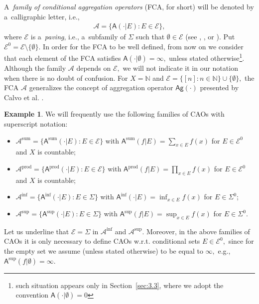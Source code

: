 \documentclass[preprint,11pt]{elsarticle}
\theoremstyle{definition}
\newtheorem{example}[tw]{Example}
\newcommand\mN{{\mathbb N}}
\newcommand\cE{{\mathcal E}}
\newcommand\sA{\mathsf{A}}
\newcommand\aA[2][E]{\sA(#2|#1)}%
\newcommand\aAi[3][E]{\sA^{#3}(#2|#1)}%
\newcommand\bA{\mathscr{A}}%
\newcommand\agg{\mathsf{Ag}}
\newcommand{\tx}{\textstyle{}}
\begin{document}
A~\textit{family of conditional aggregation operators} (FCA, for short) will be denoted by a~calligraphic letter, i.e.,
\begin{align}\label{n:fca}
    \bA=\{\aA{\cdot}\colon E\in \cE\},
\end{align}
where $\mathcal{E}$ is a~\textit{paving}, i.e., a~subfamily of $\Sigma$ such that $\emptyset \in \mathcal{E}$ (see \cite[p.~15]{denneberg00}, \cite[p.~254]{hahn},  or \cite[p.~7]{Pap1995}). Put $\cE^0=\cE\setminus\{\emptyset\}.$
In order for the FCA to be well defined, from now on we consider that each element of the FCA satisfies $\aA[\emptyset]{\cdot}=\infty,$  unless stated otherwise\footnote{such situation appears only in Section~\ref{sec:3.3}, where we adopt the convention $\aA[\emptyset]{\cdot}=0$}.
Although the family $\bA$ depends on $\cE,$ we will not indicate it in our notation when there is no doubt of confusion.  For $X=\mN$ and $\cE=\{[n]\colon n\in\mN\}\cup\{\emptyset\},$ the FCA $\bA$ generalizes the concept of aggregation operator $\agg(\cdot)$ presented by Calvo et al. \cite[Def.~1]{Calvo}.



\begin{example}\label{ex:basicCAOs}
We will frequently use the following families of CAOs  with superscript notation:
\begin{itemize}[noitemsep]
    \item \label{ref:sum} $\bA^{\textrm{sum}}=\{\aAi{\cdot}{\textrm{sum}}\colon E\in \cE\}$ with $\sA^{\textrm{sum}}(f|E)=\tx{\sum_{x\in E} f(x)}$ for $E\in\cE^0$ and $X$ is countable;

    \item \label{ref:prod} $\bA^{\textrm{prod}}=\{\sA^{\textrm{prod}}(\cdot|E)\colon E\in \cE\}$ with $\sA^{\textrm{prod}}(f|E)=\tx{\prod_{x\in E} f(x)}$ for $E\in\cE^0$ and $X$ is countable;

    \item $\bA^{\inf}=\{\aAi{\cdot}{\inf}\colon E\in \Sigma\}$ with $\aAi{\cdot}{\inf}=\tx{\inf_{x\in E} f(x)}$ for $E\in\Sigma^0$;

    \item $\bA^{\sup}=\{\aAi{\cdot}{\sup}\colon E\in \Sigma\}$ with $\aAi{f}{\sup}=\tx{\sup_{x\in E} f(x)}$ for $E\in\Sigma^0.$
\end{itemize}
Let us underline that $\mathcal{E}=\Sigma$ in $\mathscr{A}^{\inf}$ and $\bA^{\sup}.$ Moreover, in the above  families of CAOs  it is only necessary to define CAOs w.r.t. conditional sets $E\in \cE^0,$ since for  the empty set we assume (unless stated otherwise) to be equal to $\infty,$ e.g., $\aAi[\emptyset]{f}{\sup}=\infty.$
\end{example}
\end{document}

